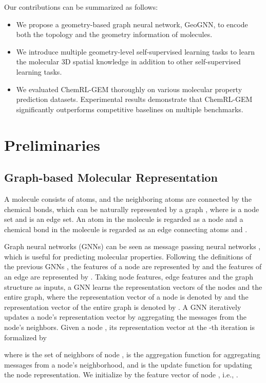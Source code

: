 \documentclass{article}
\begin{document}
Our contributions can be summarized as follows:
\begin{itemize}
    \setlength{\itemsep}{0pt}
    \item We propose a geometry-based graph neural network, GeoGNN, to encode both the topology and the geometry information of molecules.
    \item We introduce multiple geometry-level self-supervised learning tasks to learn the molecular 3D spatial knowledge in addition to other self-supervised learning tasks.
    \item We evaluated ChemRL-GEM thoroughly on various molecular property prediction datasets. Experimental results demonstrate that ChemRL-GEM significantly outperforms competitive baselines on multiple benchmarks.
\end{itemize}

\section{Preliminaries}


\subsection{Graph-based Molecular Representation}
A molecule consists of atoms, and the neighboring atoms are connected by the chemical bonds, which can be naturally represented by a graph , where  is a node set and  is an edge set. An atom in the molecule is regarded as a node  and a chemical bond in the molecule is regarded as an edge  connecting atoms  and .

Graph neural networks (GNNs) can be seen as message passing
neural networks \cite{DBLP:conf/icml/GilmerSRVD17}, which is useful for predicting molecular properties. Following the definitions of the previous GNNs \cite{DBLP:conf/iclr/XuHLJ19}, the features of a node  are represented by  and the features of an edge  are represented by . Taking node features, edge features and the graph structure as inputs, a GNN learns the representation vectors of the nodes and the entire graph, where the representation vector of a node  is denoted by  and the representation vector of the entire graph is denoted by . A GNN iteratively updates a node's representation vector by aggregating the messages from the node's neighbors. Given a node , its representation vector  at the -th iteration is formalized by

where  is the set of neighbors of node ,  is the aggregation function for aggregating messages from a node's neighborhood, and  is the update function for updating the node representation. We initialize  by the feature vector of node , i.e., .
\end{document}
